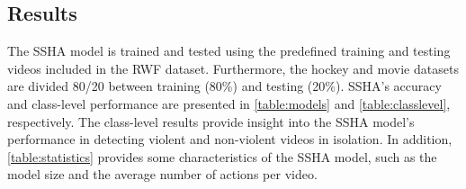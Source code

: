 \documentclass[review]{elsarticle}
\begin{document}
\begin{table}[!htbp]
\caption{Video violence datasets characteristics. }
\label{table:datasets}
\end{table}

\subsection{Results}

The SSHA model is trained and tested using the predefined training and testing videos included in the RWF dataset. Furthermore, the hockey and movie datasets are divided 80/20 between training (80\%) and testing (20\%). SSHA's accuracy and class-level performance are presented in \autoref{table:models} and \ref{table:classlevel}, respectively. The class-level results provide insight into the SSHA model's performance in detecting violent and non-violent videos in isolation. In addition, \autoref{table:statistics} provides some characteristics of the SSHA model, such as the model size and the average number of actions per video.
\end{document}
